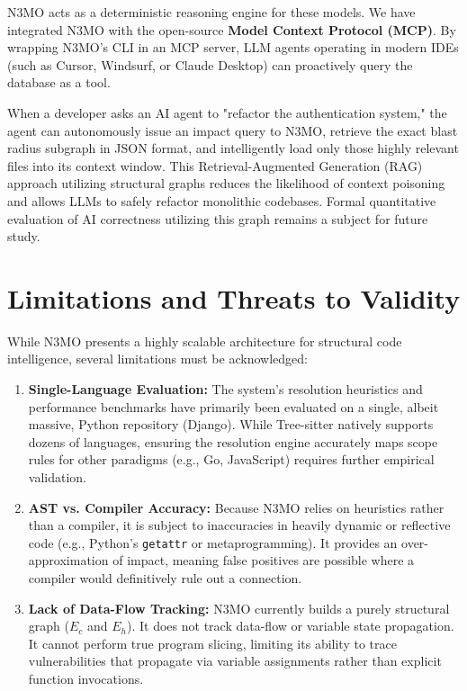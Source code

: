 \documentclass[conference]{IEEEtran}
\begin{document}
N3MO acts as a deterministic reasoning engine for these models. We have integrated N3MO with the open-source \textbf{Model Context Protocol (MCP)}. By wrapping N3MO's CLI in an MCP server, LLM agents operating in modern IDEs (such as Cursor, Windsurf, or Claude Desktop) can proactively query the database as a tool. 

When a developer asks an AI agent to "refactor the authentication system," the agent can autonomously issue an impact query to N3MO, retrieve the exact blast radius subgraph in JSON format, and intelligently load only those highly relevant files into its context window. This Retrieval-Augmented Generation (RAG) approach utilizing structural graphs reduces the likelihood of context poisoning and allows LLMs to safely refactor monolithic codebases. Formal quantitative evaluation of AI correctness utilizing this graph remains a subject for future study.

\section{Limitations and Threats to Validity}

While N3MO presents a highly scalable architecture for structural code intelligence, several limitations must be acknowledged:
\begin{enumerate}
    \item \textbf{Single-Language Evaluation:} The system's resolution heuristics and performance benchmarks have primarily been evaluated on a single, albeit massive, Python repository (Django). While Tree-sitter natively supports dozens of languages, ensuring the resolution engine accurately maps scope rules for other paradigms (e.g., Go, JavaScript) requires further empirical validation.
    \item \textbf{AST vs. Compiler Accuracy:} Because N3MO relies on heuristics rather than a compiler, it is subject to inaccuracies in heavily dynamic or reflective code (e.g., Python's \texttt{getattr} or metaprogramming). It provides an over-approximation of impact, meaning false positives are possible where a compiler would definitively rule out a connection.
    \item \textbf{Lack of Data-Flow Tracking:} N3MO currently builds a purely structural graph ($E_c$ and $E_h$). It does not track data-flow or variable state propagation. It cannot perform true program slicing, limiting its ability to trace vulnerabilities that propagate via variable assignments rather than explicit function invocations.
\end{enumerate}
\end{document}
